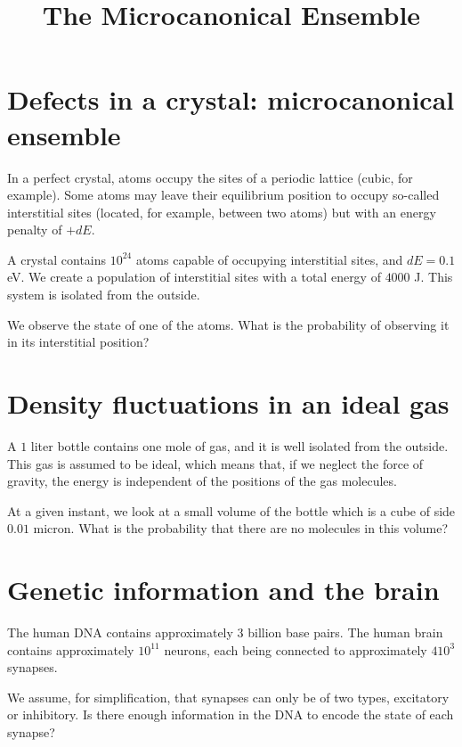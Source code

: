 \documentclass[english]{article}
\begin{document}
	\title{The Microcanonical Ensemble}
	\author{}
	\date{}
	
	\maketitle
	
	\section{Defects in a crystal: microcanonical ensemble}
	\begin{tcolorbox}[colback=blue!5!white,colframe=blue!75!black]
		\quad In a perfect crystal, atoms occupy the sites of a periodic lattice (cubic, for example). Some atoms may leave their equilibrium position to occupy so-called interstitial sites (located, for example, between two atoms) but with an energy penalty of $+dE$.
		
		\quad A crystal contains $10^{24}$ atoms capable of occupying interstitial sites, and $dE=0.1$ eV. We create a population of interstitial sites with a total energy of $4000$ J. This system is isolated from the outside.
		
		\quad We observe the state of one of the atoms. What is the probability of observing it in its interstitial position?
	\end{tcolorbox}

	\section{Density fluctuations in an ideal gas}
	\begin{tcolorbox}[colback=blue!5!white,colframe=blue!75!black]
		\quad A $1$ liter bottle contains one mole of gas, and it is well isolated from the outside. This gas is assumed to be ideal, which means that, if we neglect the force of gravity, the energy is independent of the positions of the gas molecules.
		
		\quad At a given instant, we look at a small volume of the bottle which is a cube of side $0.01$ micron. What is the probability that there are no molecules in this volume?
	\end{tcolorbox}


	\section{Genetic information and the brain}
	\begin{tcolorbox}[colback=blue!5!white,colframe=blue!75!black]
		\quad The human DNA contains approximately $3$ billion base pairs. The human brain contains approximately $10^{11}$ neurons, each being connected to approximately $410^3$ synapses.
		
		\quad We assume, for simplification, that synapses can only be of two types, excitatory or inhibitory. Is there enough information in the DNA to encode the state of each synapse?
	\end{tcolorbox}
	
	
	
\end{document}
